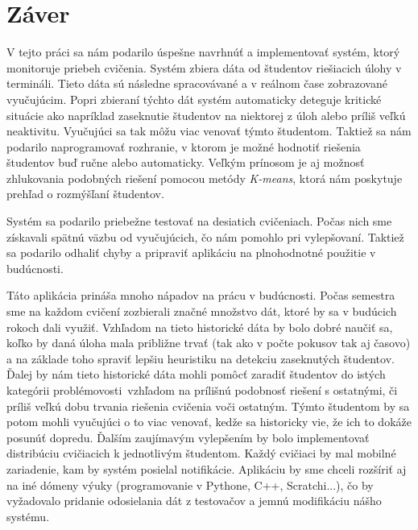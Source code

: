 \chapter*{Záver}  %

V tejto práci sa nám podarilo úspešne navrhnúť a implementovať systém, ktorý monitoruje
priebeh cvičenia. Systém zbiera dáta od študentov riešiacich úlohy v termináli.
Tieto dáta sú následne spracovávané a v reálnom čase zobrazované vyučujúcim.
Popri zbieraní týchto dát systém automaticky deteguje kritické situácie ako napríklad
zaseknutie študentov na niektorej z úloh alebo príliš veľkú neaktivitu. Vyučujúci
sa tak môžu viac venovať týmto študentom. Taktiež sa nám podarilo naprogramovať
rozhranie, v ktorom je možné hodnotiť riešenia študentov buď ručne alebo automaticky.
Veľkým prínosom je aj možnosť zhlukovania podobných riešení pomocou metódy
\textit{K-means}, ktorá nám poskytuje prehľad o rozmýšľaní študentov.

Systém sa podarilo priebežne testovať na desiatich cvičeniach.
Počas nich sme získavali spätnú
väzbu od vyučujúcich, čo nám pomohlo pri vylepšovaní. Taktiež sa podarilo odhaliť
chyby a pripraviť aplikáciu na plnohodnotné použitie v budúcnosti.

Táto aplikácia prináša mnoho nápadov na prácu v budúcnosti. Počas semestra
sme na každom cvičení zozbierali značné množstvo dát, ktoré by sa v budúcich rokoch
dali využiť.
Vzhľadom na tieto historické dáta by bolo dobré naučiť sa, koľko by daná úloha mala
približne trvať (tak ako v počte pokusov tak aj časovo) a na základe toho spraviť lepšiu
heuristiku na detekciu zaseknutých študentov.
Ďalej by nám tieto historické dáta mohli pomôcť zaradiť študentov do istých
\glqq kategórii problémovosti\grqq~vzhľadom na prílišnú podobnosť riešení s ostatnými,
či príliš veľkú dobu trvania riešenia cvičenia voči ostatným. Týmto študentom by sa
potom mohli vyučujúci o to viac venovať, kedže sa historicky vie, že ich to dokáže
posunúť dopredu. Ďalším zaujímavým vylepšením by bolo implementovať distribúciu cvičiacich
k jednotlivým
študentom. Každý cvičiaci by mal mobilné zariadenie, kam by systém posielal
notifikácie. Aplikáciu by sme chceli rozšíriť aj na iné dómeny výuky
(programovanie v Pythone, C++, Scratchi...), čo by vyžadovalo pridanie odosielania
dát z testovačov a jemnú modifikáciu nášho systému.




